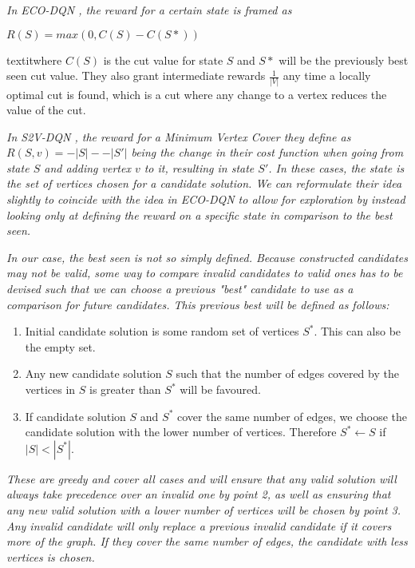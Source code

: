\documentclass{article}
\begin{document}
\textit{In ECO-DQN \cite{eco-dqn}, the reward for a certain state is framed as}

$R(S) = max(0, C(S) - C(S*))$

textit{where $C(S)$ is the cut value for state $S$ and $S*$ will be the previously best seen cut value. They also grant intermediate rewards $\frac{1}{|V|}$ any time a locally optimal cut is found, which is a cut where any change to a vertex reduces the value of the cut.}

\textit{In S2V-DQN \cite{s2v-dqn}, the reward for a Minimum Vertex Cover they define as $R(S, v) = -|S| - -|S'|$ being the change in their cost function when going from state $S$ and adding vertex $v$ to it, resulting in state $S'$. In these cases, the state is the set of vertices chosen for a candidate solution. We can reformulate their idea slightly to coincide with the idea in ECO-DQN to allow for exploration by instead looking only at defining the reward on a specific state in comparison to the best seen.}

\textit{In our case, the best seen is not so simply defined. Because constructed candidates may not be valid, some way to compare invalid candidates to valid ones has to be devised such that we can choose a previous "best" candidate to use as a comparison for future candidates. This previous best will be defined as follows:}

\begin{enumerate}
    \item Initial candidate solution is some random set of vertices $S^*$. This can also be the empty set. 
    \item Any new candidate solution $S$ such that the number of edges covered by the vertices in $S$ is greater than $S^*$ will be favoured.
    \item If candidate solution $S$ and $S^*$ cover the same number of edges, we choose the candidate solution with the lower number of vertices. Therefore $S^* \leftarrow S$ if $|S| < |S^*|$. 
\end{enumerate}

\textit{These are greedy and cover all cases and will ensure that any valid solution will always take precedence over an invalid one by point 2, as well as ensuring that any new valid solution with a lower number of vertices will be chosen by point 3. Any invalid candidate will only replace a previous invalid candidate if it covers more of the graph. If they cover the same number of edges, the candidate with less vertices is chosen.}
\end{document}
